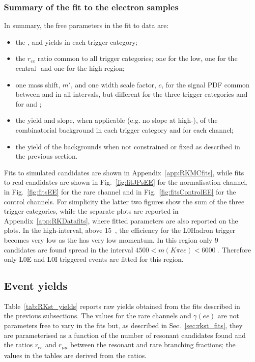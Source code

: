 
\subsubsection{Summary of the fit to the electron samples}

In summary, the free parameters in the fit to data are:
%
\begin{itemize}
\item the \BdToKstJPsee, \BdToKstPsiee and \BdToKstGee yields in each trigger category;
\item the $r_{ee}$ ratio common to all trigger categories; one for the low, one for the central- and one for the high-\qsq region;
\item one mass shift, $m'$, and one width scale factor, $c$, for the signal PDF common between \BdToKstJPsee and \BdToKstee in all intervals,
but different for the three trigger categories and for \BdToKstPsiee and \BdToKstGee;
\item the yield and slope, when applicable (e.g. no slope at high-\qsq), of the combinatorial background in each trigger category and for each channel;
\item the yield of the backgrounds when not constrained or fixed as described in the previous section.
\end{itemize}

Fits to simulated \BdToKstJPsee candidates are shown in Appendix~\ref{app:RKMCfits}, while
fits to real candidates are shown in Fig.~\ref{fig:fitJPsEE} for the normalisation channel, in Fig.~\ref{fig:fitsEE} 
for the rare channel and in Fig.~\ref{fig:fitsControlEE} for the control channels.
For simplicity the latter two figures show the sum of the three trigger categories, while the separate plots are
reported in Appendix~\ref{app:RKDatafits}, where fitted parameters are also reported on the plots.
%
In the high-\qsq interval, above 15~\gevgevcccc, the efficiency for the
L0Hadron trigger becomes very low as the \Kstarz has very low momentum.
In this region only 9 candidates are found spread in the interval
$4500 < m(K\pi ee) < 6000$ \mevcc. Therefore
only L0E and L0I triggered events are fitted for this region.

\subsection{Event yields}

Table~\ref{tab:RKst_yields} reports raw yields obtained from the
fits described in the previous subsections. The values for the rare channels and $\gamma(ee)$ are
 not parameters free to vary in the fits but, as described in Sec.~\ref{sec:rkst_fits}, they are parameterised
as a function of the number of resonant candidates found and the ratios $r_{ee}$ and $r_{\mu\mu}$
between the resonant and rare branching fractions; the values in the tables are derived from the ratios. 

